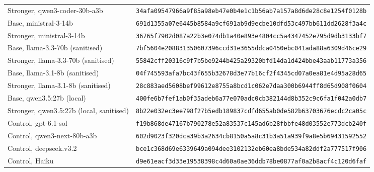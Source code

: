 \documentclass[11pt]{article}
\begin{document}
\begin{table}[!htb]
\begin{tabularx}{\linewidth}{@{}Yl@{}}
Stronger, qwen3-coder-30b-a3b & \texttt{34afa09547966a9f85a98eb47e0b4e1c1b56ab7a157a8d6de28c8e1254f0128b} \\
Base, ministral-3-14b & \texttt{691d1355a07e6445b8584a9cf691ab9d9ecbe10dfd53c497bb611dd2628f3a4c} \\
Stronger, ministral-3-14b & \texttt{36765f7902d087a22b3e074db1a40e893e4804cc5a4347452e795d9db3133bf7} \\
Base, llama-3.3-70b (sanitised) & \texttt{7bf5604e208831350607396ccd31e3655ddca0450ebc041ada88a6309d46ce29} \\
Stronger, llama-3.3-70b (sanitised) & \texttt{55842cff20316c9f7b5be9244b425a29320bfd14da1d424bbe43aab11773a356} \\
Base, llama-3.1-8b (sanitised) & \texttt{04f745593afa7bc43f655b32678d3e77b16cf2f4345cd07a0ea81e4d95a28d65} \\
Stronger, llama-3.1-8b (sanitised) & \texttt{28c883aed5608bef99612e8755a8bcd1c062e7daa300b6944ff8d65d908f0604} \\
Base, qwen3.5:27b (local) & \texttt{400fe6b7fef1ab0f35adeb6a77e070adc0cb382144d8b352c9c6fa1f042a0db7} \\
Stronger, qwen3.5:27b (local, sanitised) & \texttt{8b22e032ec3ee798f27b5edb189837cdfd655ab0de582b63703676ecdc2ca05c} \\
Control, gpt-6.1-sol & \texttt{f19b868de47167b790278e52a83537c145ad6b28fbbfe48d03552e773dcb240f} \\
Control, qwen3-next-80b-a3b & \texttt{602d9023f320dca39b3a2634cb8150a5a8c31b3a51a939f9a8e5b69431592552} \\
Control, deepseek.v3.2 & \texttt{bce1c368d69e6339649a094dee3102132eb60ea8bde534a82ddf2a777517f906} \\
Control, Haiku & \texttt{d9e61eacf3d33e19538398c4d60a0ae36ddb78be0877af0a2b8acf4c120d6faf} \\
\bottomrule
\end{tabularx}
\end{table}
\end{document}
